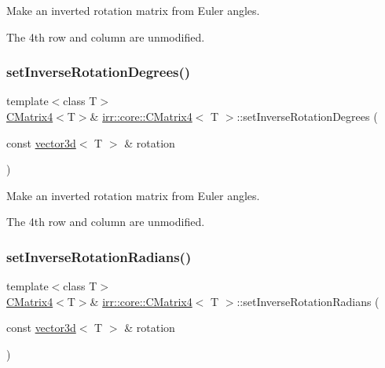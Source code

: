 Make an inverted rotation matrix from Euler angles. 

The 4th row and column are unmodified. \mbox{\label{classirr_1_1core_1_1CMatrix4_abf572f53301bb5d00ceeec9f170aff92}} 
\subsubsection{\texorpdfstring{set\+Inverse\+Rotation\+Degrees()}{setInverseRotationDegrees()}\hspace{0.1cm}{\footnotesize\ttfamily [2/2]}}
{\footnotesize\ttfamily template$<$class T$>$ \\
\hyperlink{classirr_1_1core_1_1CMatrix4}{C\+Matrix4}$<$T$>$\& \hyperlink{classirr_1_1core_1_1CMatrix4}{irr\+::core\+::\+C\+Matrix4}$<$ T $>$\+::set\+Inverse\+Rotation\+Degrees (\begin{DoxyParamCaption}\item[{const \hyperlink{classirr_1_1core_1_1vector3d}{vector3d}$<$ T $>$ \&}]{rotation }\end{DoxyParamCaption})\hspace{0.3cm}{\ttfamily [inline]}}



Make an inverted rotation matrix from Euler angles. 

The 4th row and column are unmodified. \mbox{\label{classirr_1_1core_1_1CMatrix4_a78fd2ee43a622062169762e093813311}} 
\subsubsection{\texorpdfstring{set\+Inverse\+Rotation\+Radians()}{setInverseRotationRadians()}\hspace{0.1cm}{\footnotesize\ttfamily [1/2]}}
{\footnotesize\ttfamily template$<$class T$>$ \\
\hyperlink{classirr_1_1core_1_1CMatrix4}{C\+Matrix4}$<$T$>$\& \hyperlink{classirr_1_1core_1_1CMatrix4}{irr\+::core\+::\+C\+Matrix4}$<$ T $>$\+::set\+Inverse\+Rotation\+Radians (\begin{DoxyParamCaption}\item[{const \hyperlink{classirr_1_1core_1_1vector3d}{vector3d}$<$ T $>$ \&}]{rotation }\end{DoxyParamCaption})\hspace{0.3cm}{\ttfamily [inline]}}



